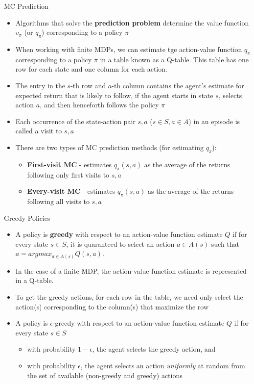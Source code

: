 \documentclass[10pt,mathserif]{beamer}
\begin{document}
\begin{frame}{MC Prediction}
\begin{itemize}
\item Algorithms that solve the \textbf{prediction problem} determine the value function $v_{\pi}$ (or $q_{\pi}$)
corresponding to a policy $\pi$
\item When working with finite MDPs, we can estimate tge action-value function $q_{\pi}$ corresponding to a policy $\pi$ in a table known as a Q-table. This table has one row for each state and one column for each action.
\item The entry in the $s$-th row and $a$-th column contains the agent's estimate for expected return that is likely to follow, if the agent starts in state $s$, selects action $a$, and then henceforth follows the policy $\pi$
\item Each occurrence of the state-action pair $s,a$ ($s\in S, a\in A$) in an episode is called a visit to $s,a$
\item There are two types of MC prediction methods (for estimating $q_\pi$):
\begin{itemize}
\item \textbf{First-visit MC} - estimates $q_\pi(s,a)$ as the average of the returns following only first visits to $s,a$
\item \textbf{Every-visit MC} - estimates $q_\pi(s,a)$ as the average of the returns following all visits to $s,a$
\end{itemize}
\end{itemize}
\end{frame}

\begin{frame}{Greedy Policies}
\begin{itemize}
\item A policy is \textbf{greedy} with respect to an action-value function estimate $Q$ if for every state $s\in S$, it is quaranteed to select an action $a\in A(s)$ such that $a = argmax_{a\in A(s)}Q(s,a)$.
\item In the case of a finite MDP, the action-value function estimate is represented in a Q-table.
\item To get the greedy actions, for each row in the table, we need only select the action(s) corresponding to the
column(s) that maximize the row
\item A policy is $\epsilon$-greedy with respect to an action-value function estimate $Q$ if for every state $s\in S$
\begin{itemize}
\item with probability $1-\epsilon$, the agent selects the greedy action, and
\item with probability $\epsilon$, the agent selects an action \textit{uniformly} at random from the set of available (non-greedy and greedy) actions
\end{itemize} 
\end{itemize}
\end{frame}
\end{document}
